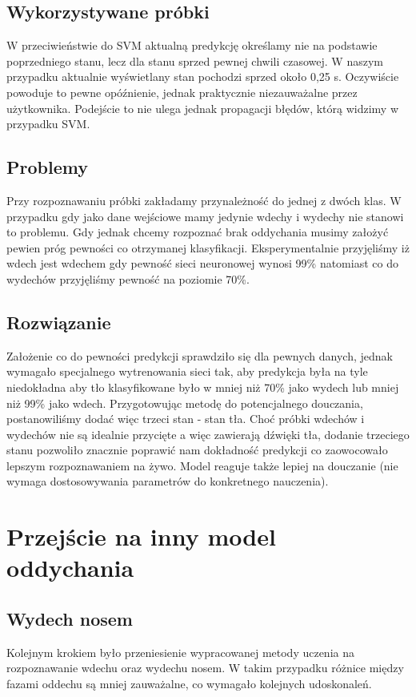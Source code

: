 \documentclass[polish]{article}
\begin{document}
\subsection{Wykorzystywane próbki}
W przeciwieństwie do SVM aktualną predykcję określamy nie na podstawie poprzedniego stanu, lecz dla stanu sprzed pewnej chwili czasowej. W naszym przypadku aktualnie wyświetlany stan pochodzi sprzed około 0,25 \unit{s}. Oczywiście powoduje to pewne opóźnienie, jednak praktycznie niezauważalne przez użytkownika. Podejście to nie ulega jednak propagacji błędów, którą widzimy w przypadku SVM.
\subsection{Problemy}
Przy rozpoznawaniu próbki zakładamy przynależność do jednej z dwóch klas. W przypadku gdy jako dane wejściowe mamy jedynie wdechy i wydechy nie stanowi to problemu. Gdy jednak chcemy rozpoznać brak oddychania musimy założyć pewien próg pewności co otrzymanej klasyfikacji. Eksperymentalnie przyjęliśmy iż wdech jest wdechem gdy pewność sieci neuronowej wynosi 99\% natomiast co do wydechów przyjęliśmy pewność na poziomie 70\%. 

\subsection{Rozwiązanie}
Założenie co do pewności predykcji sprawdziło się dla pewnych danych, jednak wymagało specjalnego wytrenowania sieci tak, aby predykcja była na tyle niedokładna aby tło klasyfikowane było w mniej niż 70\% jako wydech lub mniej niż 99\% jako wdech. Przygotowując metodę do potencjalnego douczania, postanowiliśmy dodać więc trzeci stan - stan tła. Choć próbki wdechów i wydechów nie są idealnie przycięte a więc zawierają dźwięki tła, dodanie trzeciego stanu pozwoliło znacznie poprawić nam dokładność predykcji co zaowocowało lepszym rozpoznawaniem na żywo. Model reaguje także lepiej na douczanie (nie wymaga dostosowywania parametrów do konkretnego nauczenia).


\section{Przejście na inny model oddychania}
\subsection{Wydech nosem}
Kolejnym krokiem było przeniesienie wypracowanej metody uczenia na rozpoznawanie wdechu oraz wydechu nosem. W takim przypadku różnice między fazami oddechu są mniej zauważalne, co wymagało kolejnych udoskonaleń.
\end{document}
